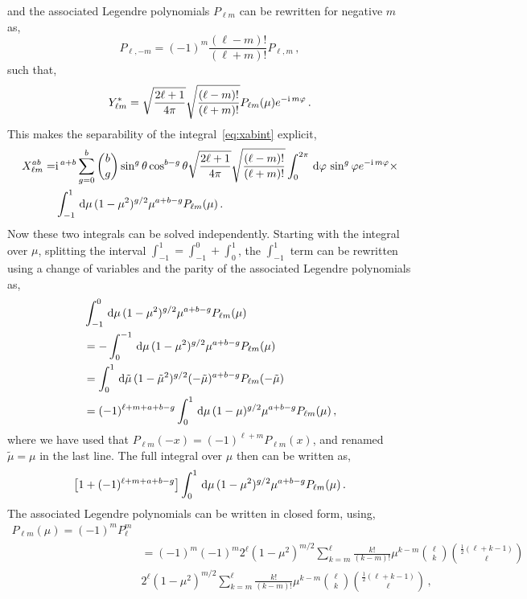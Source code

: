 and the associated Legendre polynomials $P_{\ell m}$ can be rewritten for negative $m$ as, 
\begin{equation}
	P_{\ell,-m} = (-1)^m \frac{(\ell - m)!}{(\ell + m)!} P_{\ell,m}\,,
\end{equation}
such that, 
\begin{equation}
	Y^*_{\ell m} = \sqrt{\frac{2\ell + 1}{4 \pi}} \sqrt{\frac{(\ell - m)!}{(\ell + m)!}} P_{\ell m}(\mu) e^{-\mathrm{i\,} m \varphi} \,.
\end{equation}
This makes the separability of the integral~\eqref{eq:xabint} explicit, 
\begin{align}
	X_{\ell m}^{ab} =& \mathrm{i\,}^{a+b} \sum_{g=0}^b \binom{b}{g} \sin^g\theta \cos^{b-g}\theta \sqrt{\frac{2\ell + 1}{4\pi}} \sqrt{\frac{(\ell - m)!}{(\ell + m)!}} \int_0^{2\pi}\,\mathrm{d}\varphi\, \sin^g\varphi e^{-\mathrm{i\,} m \varphi} \times \nonumber \\
	& \int_{-1}^1 \,\mathrm{d}\mu\, (1-\mu^2)^{g/2} \mu^{a+b-g} P_{\ell m}(\mu)\,.
\end{align}
Now these two integrals can be solved independently. Starting with the integral over $\mu$, splitting the interval $\int_{-1}^1 = \int_{-1}^0 + \int_0^1$, the $\int_{-1}^1$ term can be rewritten using a change of variables and the parity of the associated Legendre polynomials as, 
\begin{align}
	&\int_{-1}^0\,\mathrm{d}\mu\, (1-\mu^2)^{g/2} \mu^{a+b-g} P_{\ell m}(\mu) \nonumber \\
	&= - \int_0^{-1}\,\mathrm{d}\mu\, (1-\mu^2)^{g/2} \mu^{a+b-g} P_{\ell m}(\mu) \nonumber \\
	&= \int_0^1\,\mathrm{d}\tilde{\mu}\, (1-\tilde{\mu}^2)^{g/2}(-\tilde{\mu})^{a+b-g} P_{\ell m}(-\tilde{\mu}) \nonumber \\
	&= (-1)^{\ell + m + a + b - g} \int_0^1 \,\mathrm{d}\mu\, (1-\mu)^{g/2} \mu^{a+b-g} P_{\ell m}(\mu)\,,
\end{align}
where we have used that $P_{\ell m}(-x) = (-1)^{\ell + m} P_{\ell m}(x)$, and renamed $\tilde{\mu} = \mu$ in the last line. The full integral over $\mu$ then can be written as, 
\begin{equation}
	\left[ 1 + (-1)^{\ell+m+a+b-g} \right] \int_0^1 \,\mathrm{d}\mu\, (1-\mu^2)^{g/2} \mu^{a+b-g} P_{\ell m}(\mu)\,.
\end{equation}
The associated Legendre polynomials can be written in closed form, using, 
\begin{align}
	P_{\ell m}(\mu) = (-1)^m P_\ell^m \nonumber \\
	&= (-1)^m (-1)^m 2^\ell (1-\mu^2)^{m/2} \sum_{k = m}^\ell \frac{k!}{(k-m)!} \mu^{k-m} \binom{\ell}{k} \binom{\frac{1}{2}(\ell + k - 1)}{\ell} \nonumber \\
	& 2^\ell (1-\mu^2)^{m/2} \sum_{k = m}^\ell \frac{k!}{(k-m)!} \mu^{k-m} \binom{\ell}{k} \binom{\frac{1}{2}(\ell + k - 1)}{\ell}\,,
\end{align}
